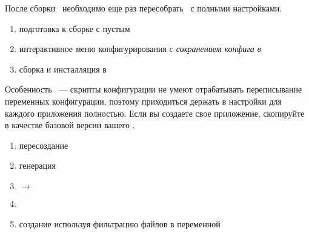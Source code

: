 


 \label{azgcc}

После сборки \ необходимо еще раз пересобрать \ с полными
настройками.

 \label{azbb}


\begin{enumerate}[nosep]
  \item подготовка к сборке с пустым 
  \item интерактивное меню конфигурирования \emph{с сохранением конфига в
  }
  \item сборка и инсталляция в 
\end{enumerate}

\bigskip
Особенность \ --- скрипты конфигурации не умеют отрабатывать
переписывание переменных конфигурации, поэтому приходиться держать в
 настройки для каждого приложения полностью. Если вы создаете
свое приложение, скопируйте  в качестве базовой версии вашего
.

 \label{azlibs}

\label{azapps}

 \label{azuser}

 \label{azroot}


\begin{enumerate}[nosep]
  \item пересоздание 
  \item генерация  
  \item {} $\rightarrow$ 
  \item {}
  \item создание  используя фильтрацию файлов  в переменной 
\end{enumerate}


